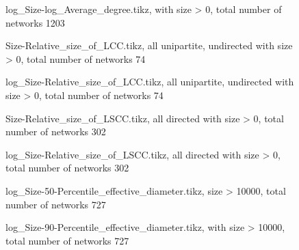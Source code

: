 \documentclass[fleqn]{article}
\begin{document}
	\begin{figure}[!htb]
		\centering
		
		\caption{log\_Size-log\_Average\_degree.tikz, with size > 0, total number of networks 1203}
	\end{figure}

	\begin{figure}[!htb]
		\centering
		
		\caption{Size-Relative\_size\_of\_LCC.tikz, all unipartite, undirected with size > 0, total number of networks 74}
	\end{figure}

	\begin{figure}[!htb]
		\centering
		
		\caption{log\_Size-Relative\_size\_of\_LCC.tikz, all unipartite, undirected with size > 0, total number of networks 74}
	\end{figure}

	\begin{figure}[!htb]
		\centering
		
		\caption{Size-Relative\_size\_of\_LSCC.tikz, all directed with size > 0, total number of networks 302}
	\end{figure}


	\begin{figure}[!htb]
		\centering
		
		\caption{log\_Size-Relative\_size\_of\_LSCC.tikz,  all directed with size > 0, total number of networks 302}
	\end{figure}

	\begin{figure}[!htb]
		\centering
		
		\caption{log\_Size-50-Percentile\_effective\_diameter.tikz, size > 10000, total number of networks 727}
	\end{figure}

	\begin{figure}[!htb]
		\centering
		
		\caption{log\_Size-90-Percentile\_effective\_diameter.tikz, with size > 10000, total number of networks 727}
	\end{figure}
	
\end{document}
